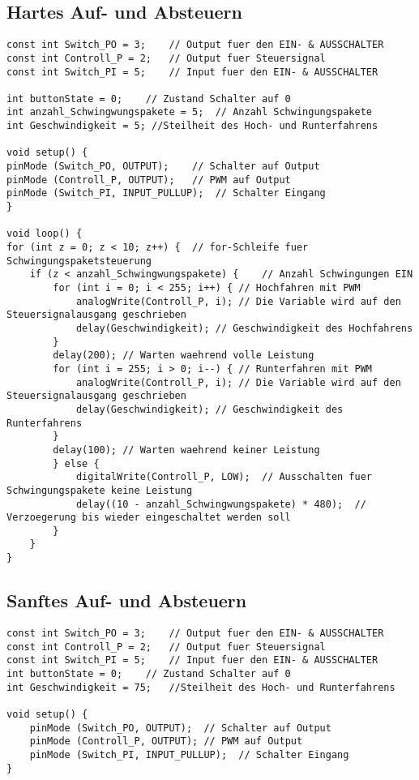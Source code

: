 \begin{appendix}
\subsection*{Hartes Auf- und Absteuern}
\begin{lstlisting}[basicstyle=\tiny,style=myArduino]
const int Switch_PO = 3;	// Output fuer den EIN- & AUSSCHALTER
const int Controll_P = 2;	// Output fuer Steuersignal
const int Switch_PI = 5;	// Input fuer den EIN- & AUSSCHALTER

int buttonState = 0;	// Zustand Schalter auf 0
int anzahl_Schwingwungspakete = 5;	// Anzahl Schwingungspakete
int Geschwindigkeit = 5; //Steilheit des Hoch- und Runterfahrens

void setup() {
pinMode (Switch_PO, OUTPUT);	// Schalter auf Output
pinMode (Controll_P, OUTPUT);	// PWM auf Output
pinMode (Switch_PI, INPUT_PULLUP);	// Schalter Eingang
}

void loop() {
for (int z = 0; z < 10; z++) {	// for-Schleife fuer Schwingungspaketsteuerung
	if (z < anzahl_Schwingwungspakete) {	// Anzahl Schwingungen EIN
		for (int i = 0; i < 255; i++) {	// Hochfahren mit PWM
			analogWrite(Controll_P, i);	// Die Variable wird auf den Steuersignalausgang geschrieben
			delay(Geschwindigkeit);	// Geschwindigkeit des Hochfahrens
		}
		delay(200);	// Warten waehrend volle Leistung
		for (int i = 255; i > 0; i--) {	// Runterfahren mit PWM
			analogWrite(Controll_P, i);	// Die Variable wird auf den Steuersignalausgang geschrieben
			delay(Geschwindigkeit);	// Geschwindigkeit des Runterfahrens
		}
		delay(100);	// Warten waehrend keiner Leistung
		} else {
			digitalWrite(Controll_P, LOW);	// Ausschalten fuer Schwingungspakete keine Leistung
			delay((10 - anzahl_Schwingwungspakete) * 480);	// Verzoegerung bis wieder eingeschaltet werden soll
		}
	}
}
\end{lstlisting}

\newpage
\subsection*{Sanftes Auf- und Absteuern}
\begin{lstlisting}[basicstyle=\tiny,style=myArduino]
const int Switch_PO = 3;	// Output fuer den EIN- & AUSSCHALTER
const int Controll_P = 2;	// Output fuer Steuersignal
const int Switch_PI = 5;	// Input fuer den EIN- & AUSSCHALTER
int buttonState = 0;	// Zustand Schalter auf 0
int Geschwindigkeit = 75;	//Steilheit des Hoch- und Runterfahrens

void setup() {
	pinMode (Switch_PO, OUTPUT);  // Schalter auf Output
	pinMode (Controll_P, OUTPUT); // PWM auf Output
	pinMode (Switch_PI, INPUT_PULLUP);  // Schalter Eingang
}


\end{lstlisting}
\end{appendix}
